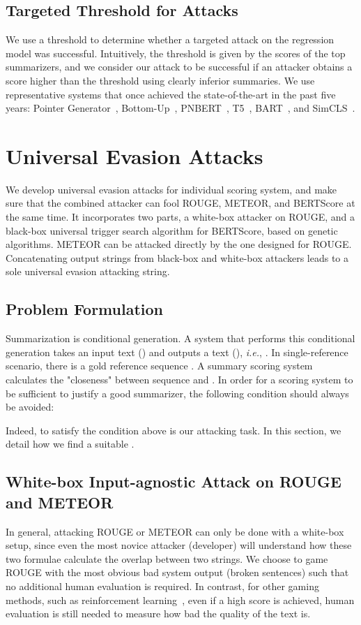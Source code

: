 \documentclass[11pt]{article}
\theoremstyle{remark}
\begin{document}
\subsection{Targeted Threshold for Attacks}
We use a threshold to determine whether a targeted attack on the regression model was successful. Intuitively, the threshold is given by the scores of the top summarizers, and we consider our attack to be successful if an attacker obtains a score higher than the threshold using clearly inferior summaries. We use representative systems that once achieved the state-of-the-art in the past five years: Pointer Generator~\cite{see-etal-2017-get}, Bottom-Up~\cite{gehrmann-etal-2018-bottom}, PNBERT~\cite{zhong-etal-2019-searching}, T5~\cite{raffel2019exploring},
BART~\cite{lewis-etal-2020-bart}, and SimCLS~\cite{liu-liu-2021-simcls}.


\section{Universal Evasion Attacks}\label{sec:methods}
We develop universal evasion attacks for individual scoring system, and make sure that the combined attacker can fool ROUGE, METEOR, and BERTScore at the same time. It incorporates two parts, a white-box attacker on ROUGE, and a black-box universal trigger search algorithm for BERTScore, based on genetic algorithms. METEOR can be attacked directly by the one designed for ROUGE. Concatenating output strings from black-box and white-box attackers leads to a sole universal evasion attacking string.

\subsection{Problem Formulation}

Summarization is conditional generation. A system  that performs this conditional generation takes an input text () and outputs a text (), \emph{i.e.}, . In single-reference scenario, there is a gold reference sequence . A summary scoring system  calculates the "closeness" between sequence  and . In order for a scoring system to be sufficient to justify a good summarizer, the following condition should always be avoided:


Indeed, to satisfy the condition above is our attacking task. In this section, we detail how we find a suitable .

\subsection{White-box Input-agnostic Attack on ROUGE and METEOR}
In general, attacking ROUGE or METEOR can only be done with a white-box setup, since even the most novice attacker (developer) will understand how these two formulae calculate the overlap between two strings. We choose to game ROUGE with the most obvious bad system output (broken sentences) such that no additional human evaluation is required. In contrast, for other gaming methods, such as reinforcement learning~\cite{paulus2018a}, even if a high score is achieved, human evaluation is still needed to measure how bad the quality of the text is.
\end{document}
